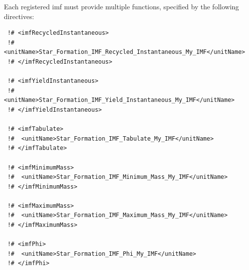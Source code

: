 Each registered \gls{imf} must provide multiple functions, specified by the following directives:
\begin{verbatim}
 !# <imfRecycledInstantaneous>
 !#  <unitName>Star_Formation_IMF_Recycled_Instantaneous_My_IMF</unitName>
 !# </imfRecycledInstantaneous>

 !# <imfYieldInstantaneous>
 !#  <unitName>Star_Formation_IMF_Yield_Instantaneous_My_IMF</unitName>
 !# </imfYieldInstantaneous>

 !# <imfTabulate>
 !#  <unitName>Star_Formation_IMF_Tabulate_My_IMF</unitName>
 !# </imfTabulate>

 !# <imfMinimumMass>
 !#  <unitName>Star_Formation_IMF_Minimum_Mass_My_IMF</unitName>
 !# </imfMinimumMass>

 !# <imfMaximumMass>
 !#  <unitName>Star_Formation_IMF_Maximum_Mass_My_IMF</unitName>
 !# </imfMaximumMass>

 !# <imfPhi>
 !#  <unitName>Star_Formation_IMF_Phi_My_IMF</unitName>
 !# </imfPhi>
\end{verbatim}

